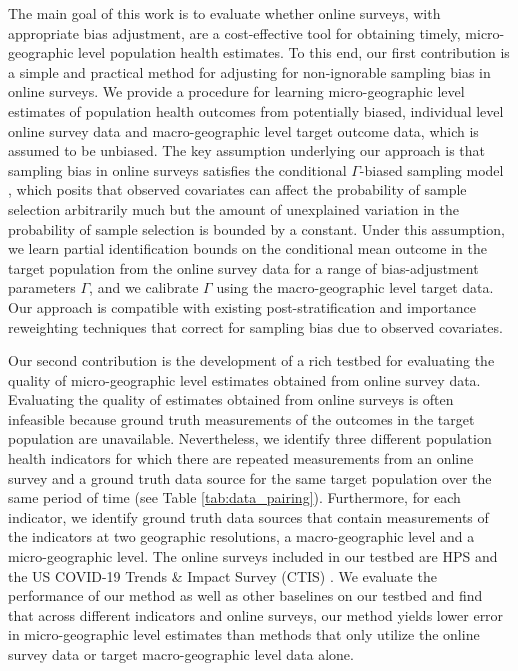 The main goal of this work is to evaluate whether online surveys, with appropriate bias adjustment, are a cost-effective tool for obtaining timely, micro-geographic level population health estimates. To this end, our first contribution is a simple and practical method for adjusting for non-ignorable sampling bias in online surveys. We provide a procedure for learning micro-geographic level estimates of population health outcomes from potentially biased, individual level online survey data and macro-geographic level target outcome data, which is assumed to be unbiased. The key assumption underlying our approach is that sampling bias in online surveys satisfies the conditional $\Gamma$-biased sampling model \citep{sahoo2022learning}, which posits that observed covariates can affect the probability of sample selection arbitrarily much but the amount of unexplained variation in the probability of sample selection is bounded by a constant. Under this assumption, we learn partial identification bounds on the conditional mean outcome in the target population from the online survey data for a range of bias-adjustment parameters $\Gamma$, and we calibrate $\Gamma$ using the macro-geographic level target data. Our approach is compatible with existing post-stratification and importance reweighting techniques that correct for sampling bias due to observed covariates.

Our second contribution is the development of a rich testbed for evaluating the quality of micro-geographic level estimates obtained from online survey data. Evaluating the quality of estimates obtained from online surveys is often infeasible because ground truth measurements of the outcomes in the target population are unavailable. Nevertheless, we identify three different population health indicators for which there are repeated measurements from an online survey and a ground truth data source for the same target population over the same period of time (see Table \ref{tab:data_pairing}). Furthermore, for each indicator, we identify ground truth data sources that contain measurements of the indicators at two geographic resolutions, a macro-geographic level and a micro-geographic level. The online surveys included in our testbed are HPS \citep{us2021measuring} and the US COVID-19 Trends \& Impact Survey (CTIS) \citep{salomon2021us}. We evaluate the performance of our method as well as other baselines on our testbed and find that across different indicators and online surveys, our method yields lower error in micro-geographic level estimates than methods that only utilize the online survey data or target macro-geographic level data alone. 

